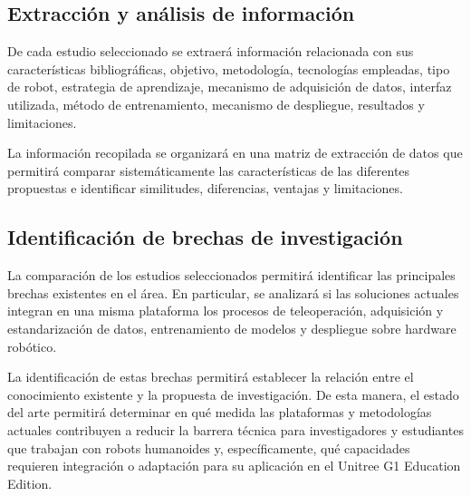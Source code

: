 \documentclass[stu,12pt,floatsintext]{apa7}
\begin{document}
\subsection{Extracción y análisis de información}

De cada estudio seleccionado se extraerá información relacionada con sus características bibliográficas, objetivo, metodología, tecnologías empleadas, tipo de robot, estrategia de aprendizaje, mecanismo de adquisición de datos, interfaz utilizada, método de entrenamiento, mecanismo de despliegue, resultados y limitaciones.

La información recopilada se organizará en una matriz de extracción de datos que permitirá comparar sistemáticamente las características de las diferentes propuestas e identificar similitudes, diferencias, ventajas y limitaciones.

\subsection{Identificación de brechas de investigación}

La comparación de los estudios seleccionados permitirá identificar las principales brechas existentes en el área. En particular, se analizará si las soluciones actuales integran en una misma plataforma los procesos de teleoperación, adquisición y estandarización de datos, entrenamiento de modelos y despliegue sobre hardware robótico.

La identificación de estas brechas permitirá establecer la relación entre el conocimiento existente y la propuesta de investigación. De esta manera, el estado del arte permitirá determinar en qué medida las plataformas y metodologías actuales contribuyen a reducir la barrera técnica para investigadores y estudiantes que trabajan con robots humanoides y, específicamente, qué capacidades requieren integración o adaptación para su aplicación en el Unitree G1 Education Edition.



\end{document}
